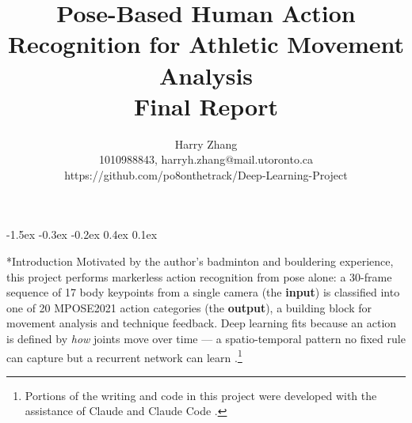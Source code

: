 \documentclass[final]{article}
\title{Pose-Based Human Action Recognition for Athletic Movement Analysis\\\large Final Report}
\author{%
  Harry Zhang\\
  1010988843, harryh.zhang@mail.utoronto.ca\\
  https://github.com/po8onthetrack/Deep-Learning-Project\\
}
\makeatletter
\renewcommand{\section}{%
  \@startsection{section}{1}{\z@}%
                {-1.5ex \@plus -0.3ex \@minus -0.2ex}%
                {0.4ex \@plus 0.1ex}%
                {\large\bf\raggedright}%
}
\makeatother
\begin{document}
\maketitle
\vspace{-0.45in}

\section*{Introduction}
Motivated by the author's badminton and bouldering experience, this project performs markerless action recognition from pose alone: a 30-frame sequence of 17 body keypoints from a single camera (the \textbf{input}) is classified into one of 20 MPOSE2021 action categories (the \textbf{output}), a building block for movement analysis and technique feedback. Deep learning fits because an action is defined by \emph{how} joints move over time --- a spatio-temporal pattern no fixed rule can capture but a recurrent network can learn \citep{du2015hierarchical}.\footnote{Portions of the writing and code in this project were developed with the assistance of Claude \citep{anthropic2026claude} and Claude Code \citep{anthropic2026claudecode}.}
\end{document}
